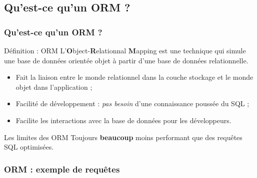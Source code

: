 	\subsection{Qu'est-ce qu'un ORM ?}
	\begin{frame}
		\frametitle{Qu'est-ce qu'un ORM ?}

		\begin{block}{Définition : ORM}
			L'\textbf{O}bject-\textbf{R}elationnal \textbf{M}apping est une technique qui simule une base de données orientée objet à partir d'une base de données relationnelle.
		\end{block}

		\vspace{2px}

		\begin{itemize}
			\item Fait la liaison entre le monde relationnel dans la couche stockage et le monde objet dans l'application ;
			\item Facilité de développement : \textit{pas besoin} d'une connaissance poussée du SQL ;
			\item Facilite les interactions avec la base de données pour les développeurs.
		\end{itemize}

		\vspace{2px}

		\begin{alertblock}{Les limites des ORM}
			Toujours \textbf{beaucoup} moins performant que des requêtes SQL optimisées.
		\end{alertblock}

	\end{frame}

	\begin{frame}
		\frametitle{ORM : exemple de requêtes}

		\begin{listing}[H]
			\inputminted[fontsize=\tiny, linenos=true]{php}{code/eloquent.php}
			\caption{Quelques requêtes basiques avec l'ORM Eloquent.}
		\end{listing}

	\end{frame}